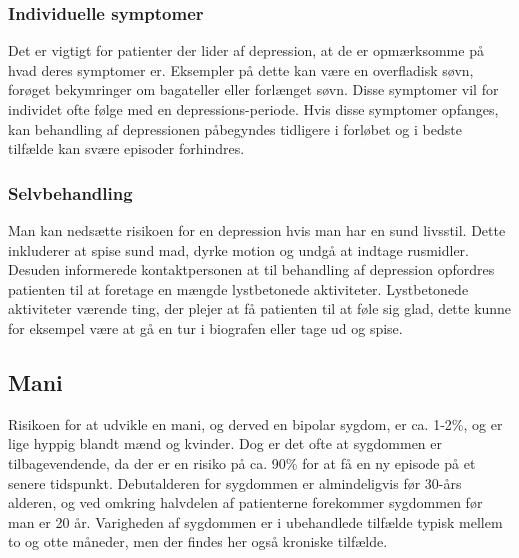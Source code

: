 \subsubsection{Individuelle symptomer}
Det er vigtigt for patienter der lider af depression, at de er opmærksomme på hvad deres symptomer er.
Eksempler på dette kan være en overfladisk søvn, forøget bekymringer om bagateller eller forlænget søvn.
Disse symptomer vil for individet ofte følge med en depressions-periode.
Hvis disse symptomer opfanges, kan behandling af depressionen påbegyndes tidligere i forløbet og i bedste tilfælde kan svære episoder forhindres.
\subsubsection{Selvbehandling}
Man kan nedsætte risikoen for en depression hvis man har en sund livsstil.
Dette inkluderer at spise sund mad, dyrke motion og undgå at indtage rusmidler.
Desuden informerede kontaktpersonen \citet{misc:janne-rasmussen} at til behandling af depression opfordres patienten til at foretage en mængde lystbetonede aktiviteter.
Lystbetonede aktiviteter værende ting, der plejer at få patienten til at føle sig glad, dette kunne for eksempel være at gå en tur i biografen eller tage ud og spise. 

\subsection{Mani}
Risikoen for at udvikle en mani, og derved en bipolar sygdom, er ca. 1-2\%, og er lige hyppig blandt mænd og kvinder.
Dog er det ofte at sygdommen er tilbagevendende, da der er en risiko på ca. 90\% for at få en ny episode på et senere tidspunkt.
Debutalderen for sygdommen er almindeligvis før 30-års alderen, og ved omkring halvdelen af patienterne forekommer sygdommen før man er 20 år.
Varigheden af sygdommen er i ubehandlede tilfælde typisk mellem to og otte måneder, men der findes her også kroniske tilfælde.

